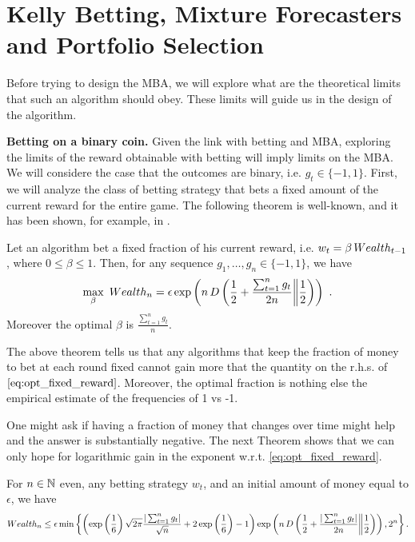 \section{Kelly Betting, Mixture Forecasters and Portfolio Selection}
\label{sec:kelly}

Before trying to design the \ac{MBA}, we will explore what are the theoretical limits that such an algorithm should obey. These limits will guide us in the design of the algorithm.

\textbf{Betting on a binary coin.}
Given the link with betting and \ac{MBA}, exploring the limits of the reward obtainable with betting will imply limits on the \ac{MBA}.
We will considere the case that the outcomes are binary, i.e. $g_t \in \{-1,1\}$.
First, we will analyze the class of betting strategy that bets a fixed amount of the current reward for the entire game.
The following theorem is well-known, and it has been shown, for example, in \cite{}.

\begin{theorem}
\label{thm:oracle_fraction}
Let an algorithm bet a fixed fraction of his current reward, i.e. $w_t=\beta \, Wealth_{t-1}$, where $0\leq\beta\leq1$. Then, for any sequence $g_1, \ldots, g_n \in \{-1,1\}$, we have
\begin{equation}
\label{eq:opt_fixed_reward}
\max_{\beta} \ Wealth_{n}
= \epsilon \exp\left(n\, D\left(\frac{1}{2}+\frac{\sum_{t=1}^n g_t}{2 n}\middle\|\frac{1}{2}\right)\right)~. 
\end{equation}
Moreover the optimal $\beta$ is $\frac{\sum_{t=1}^n g_t}{n}$.
\end{theorem}

The above theorem tells us that any algorithms that keep the fraction of money to bet at each round fixed cannot gain more that the quantity on the r.h.s. of $\eqref{eq:opt_fixed_reward}$. Moreover, the optimal fraction is nothing else the empirical estimate of the frequencies of 1 vs -1.

One might ask if having a fraction of money that changes over time might help and the answer is substantially negative. The next Theorem shows that we can only hope for logarithmic gain in the exponent w.r.t. \eqref{eq:opt_fixed_reward}.
\begin{theorem}
\label{thm:oracle_fraction_changing}
For $n \in \mathbb{N}$ even, any betting strategy $w_t$, and an initial amount of money equal to $\epsilon$, we have
\[
Wealth_{n}
\leq \epsilon \min\left\{\left(\exp\left(\frac{1}{6}\right)\sqrt{2 \pi}\frac{|\sum_{t=1}^n g_t|}{\sqrt{n}} +2\exp\left(\frac{1}{6}\right)-1\right) \exp\left(n\, D\left(\frac{1}{2}+\frac{|\sum_{t=1}^n g_t|}{2 n}\middle\|\frac{1}{2}\right)\right), 2^n\right\}.
\]
\end{theorem}


